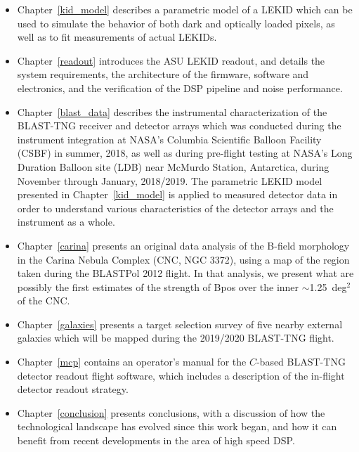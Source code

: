 \begin{itemize}
\item Chapter~\ref{kid_model} describes a parametric model of a LEKID which can be used to simulate the behavior of both dark and optically loaded pixels, as well as to fit measurements of actual LEKIDs.

\item Chapter~\ref{readout} introduces the ASU LEKID readout, and details the system requirements, the architecture of the firmware, software and electronics, and the verification of the DSP pipeline and noise performance.

\item Chapter~\ref{blast_data} describes the instrumental characterization of the BLAST-TNG receiver and detector arrays which was conducted during the instrument integration at NASA's Columbia Scientific Balloon Facility (CSBF) in summer, 2018, as well as during pre-flight testing at NASA's Long Duration Balloon site (LDB) near McMurdo Station, Antarctica, during November through January, 2018/2019. The parametric LEKID model presented in Chapter~\ref{kid_model} is applied to measured detector data in order to understand various characteristics of the detector arrays and the instrument as a whole.

\item Chapter~\ref{carina} presents an original data analysis of the B-field morphology in the Carina Nebula Complex (CNC, NGC 3372), using a map of the region taken during the BLASTPol 2012 flight. In that analysis, we present what are possibly the first estimates of the strength of \gls{Bpos} over the inner $\sim$1.25~deg$^{2}$ of the CNC\@.

\item Chapter~\ref{galaxies} presents a target selection survey of five nearby external galaxies which will be mapped during the 2019/2020 BLAST-TNG flight.

\item Chapter~\ref{mcp} contains an operator's manual for the $C$-based BLAST-TNG detector readout flight software, which includes a description of the in-flight detector readout strategy.

\item Chapter~\ref{conclusion} presents conclusions, with a discussion of how the technological landscape has evolved since this work began, and how it can benefit from recent developments in the area of high speed DSP\@.

\end{itemize}
